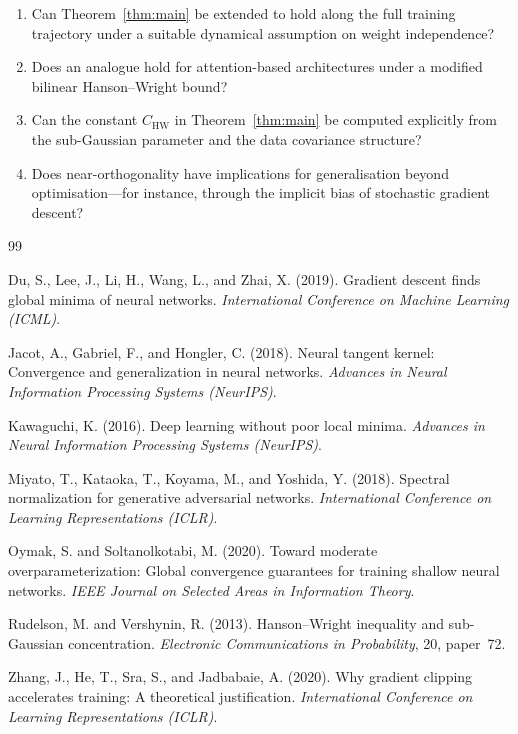 \documentclass[11pt]{article}
\theoremstyle{plain}
\theoremstyle{definition}
\theoremstyle{remark}
\begin{document}
\begin{enumerate}[label=(\arabic*)]
  \item Can Theorem~\ref{thm:main} be extended to hold along the full
        training trajectory under a suitable dynamical assumption on weight
        independence?

  \item Does an analogue hold for attention-based architectures under a
        modified bilinear Hanson--Wright bound?

  \item Can the constant $C_{\mathrm{HW}}$ in Theorem~\ref{thm:main} be
        computed explicitly from the sub-Gaussian parameter and the data
        covariance structure?

  \item Does near-orthogonality have implications for generalisation beyond
        optimisation---for instance, through the implicit bias of stochastic
        gradient descent?
\end{enumerate}


\begin{thebibliography}{99}

Du, S., Lee, J., Li, H., Wang, L., and Zhai, X. (2019).
Gradient descent finds global minima of neural networks.
\textit{International Conference on Machine Learning (ICML)}.

Jacot, A., Gabriel, F., and Hongler, C. (2018).
Neural tangent kernel: Convergence and generalization in neural networks.
\textit{Advances in Neural Information Processing Systems (NeurIPS)}.

Kawaguchi, K. (2016).
Deep learning without poor local minima.
\textit{Advances in Neural Information Processing Systems (NeurIPS)}.

Miyato, T., Kataoka, T., Koyama, M., and Yoshida, Y. (2018).
Spectral normalization for generative adversarial networks.
\textit{International Conference on Learning Representations (ICLR)}.

Oymak, S. and Soltanolkotabi, M. (2020).
Toward moderate overparameterization: Global convergence guarantees for
training shallow neural networks.
\textit{IEEE Journal on Selected Areas in Information Theory}.

Rudelson, M. and Vershynin, R. (2013).
Hanson--Wright inequality and sub-Gaussian concentration.
\textit{Electronic Communications in Probability}, 20, paper~72.

Zhang, J., He, T., Sra, S., and Jadbabaie, A. (2020).
Why gradient clipping accelerates training: A theoretical justification.
\textit{International Conference on Learning Representations (ICLR)}.

\end{thebibliography}
\end{document}
